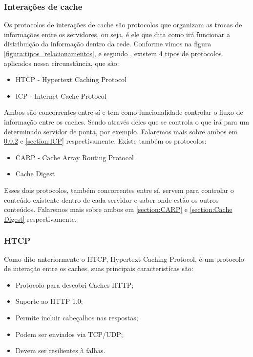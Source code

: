 \subsubsection{Intera\c{c}\~oes de cache}

Os protocolos de intera\c{c}\~oes de cache s\~ao protocolos que organizam as trocas de informa\c{c}\~oes entre os servidores, ou seja, \'e ele que dita como ir\'a funcionar a distribui\c{c}\~ao da informa\c{c}\~ao dentro da rede.
Conforme vimos na figura \ref{figura:tipos_relacionamentos}, e segundo \cite{pathan2007taxonomy}, existem 4 tipos de protocolos aplicados nessa circunst\^ancia, que s\~ao:
\begin{itemize}
\item HTCP - Hypertext Caching Protocol
\item ICP - Internet Cache Protocol
\end{itemize}
Ambos s\~ao concorrentes entre s\'i e tem como funcionalidade controlar o fluxo de informa\c{c}\~ao entre os caches. Sendo atrav\'es deles que se controla o que ir\'a para um determinado servidor de ponta, por exemplo. Falaremos mais sobre ambos em \ref{section:HTCP} e \ref{section:ICP} respectivamente.
Existe tamb\'em os protocolos:
\begin{itemize}
\item CARP -  Cache Array Routing Protocol
\item Cache Digest
\end{itemize}
Esses dois protocolos, tamb\'em concorrentes entre s\'i, servem para controlar o conte\'udo existente dentro de cada servidor e saber onde est\~ao os outros conte\'udos. Falaremos mais sobre ambos em \ref{section:CARP} e \ref{section:Cache Digest} respectivamente.

\subsubsection{HTCP}
\label{section:HTCP}
Como dito anteriormente o HTCP, Hypertext Caching Protocol, \'e um protocolo de intera\c{c}\~ao entre os caches, suas principais caracterist\'icas s\~ao:
\begin{itemize}
\item Protocolo para descobri Caches HTTP;
\item Suporte ao HTTP 1.0;
\item Permite incluir cabeçalhos nas respostas;
\item Podem ser enviados via TCP/UDP;
\item Devem ser resilientes \`a falhas.
\end{itemize}

